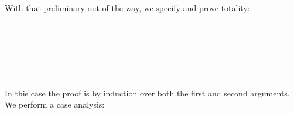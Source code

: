 With that preliminary out of the way, we specify and prove totality:

\begin{fence}
\begin{code}%
\>[0]\AgdaSpace{}%
\AgdaSymbol{:}\AgdaSpace{}%
\AgdaSpace{}%
\AgdaSymbol{(}\AgdaSpace{}%
\AgdaSpace{}%
\AgdaSymbol{:}\AgdaSpace{}%
\AgdaSymbol{)}\AgdaSpace{}%
\AgdaSpace{}%
\AgdaSpace{}%
\AgdaSpace{}%
\<%
\\
\>[0]\AgdaSpace{}%
%
\>[16]%
\>[42]\AgdaSymbol{=}%
\>[45]\AgdaSpace{}%
\<%
\\
\>[0]\AgdaSpace{}%
\AgdaSymbol{(}\AgdaSpace{}%
\AgdaSymbol{)}\AgdaSpace{}%
%
\>[42]\AgdaSymbol{=}%
\>[45]\AgdaSpace{}%
\<%
\\
\>[0]\AgdaSpace{}%
\AgdaSymbol{(}\AgdaSpace{}%
\AgdaSymbol{)}\AgdaSpace{}%
\AgdaSymbol{(}\AgdaSpace{}%
\AgdaSymbol{)}\AgdaSpace{}%
\AgdaSpace{}%
\AgdaSpace{}%
\AgdaSpace{}%
\<%
\\
\>[0]%
\>[27]\AgdaSymbol{|}\AgdaSpace{}%
\AgdaSpace{}%
%
\>[42]\AgdaSymbol{=}%
\>[45]\AgdaSpace{}%
\AgdaSymbol{(}\AgdaSpace{}%
\AgdaSymbol{)}\<%
\\
\>[0]%
\>[27]\AgdaSymbol{|}\AgdaSpace{}%
\AgdaSpace{}%
%
\>[42]\AgdaSymbol{=}%
\>[45]\AgdaSpace{}%
\AgdaSymbol{(}\AgdaSpace{}%
\AgdaSymbol{)}\<%
\end{code}
\end{fence}

In this case the proof is by induction over both the first and second
arguments. We perform a case analysis:

